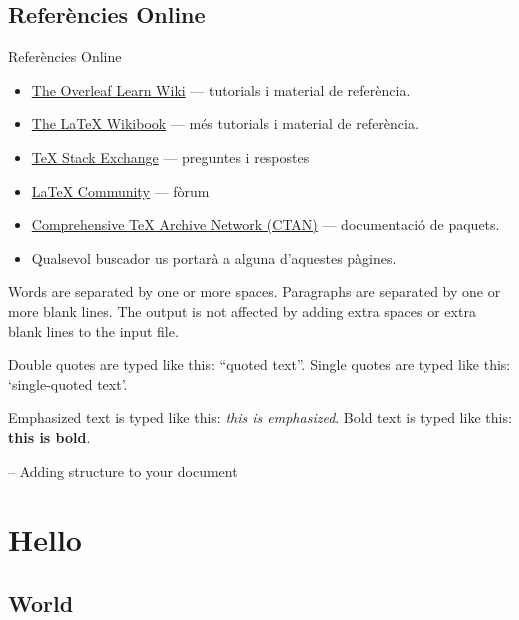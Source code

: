\subsection{Referències Online}
\begin{frame}{Referències Online}
\begin{itemize}
\item \href{https://www.overleaf.com/learn}{The Overleaf Learn Wiki} --- tutorials i material de referència.
\item \href{http://en.wikibooks.org/wiki/LaTeX}{The \LaTeX{} Wikibook} --- més tutorials i material de referència.
\item \href{http://tex.stackexchange.com/}{\TeX{} Stack Exchange} --- preguntes i respostes 
\item \href{http://www.latex-community.org/}{\LaTeX{} Community} --- fòrum 
\item \href{http://ctan.org/}{Comprehensive \TeX{} Archive Network (CTAN)} --- documentació de paquets.
\item Qualsevol buscador us portarà a alguna d'aquestes pàgines.
\end{itemize}
\end{frame}





Words are separated by one or more spaces.  Paragraphs are separated by
one or more blank lines.  The output is not affected by adding extra
spaces or extra blank lines to the input file.

Double quotes are typed like this: ``quoted text''.
Single quotes are typed like this: `single-quoted text'.

Emphasized text is typed like this: \emph{this is emphasized}.
Bold       text is typed like this: \textbf{this is bold}.

-- Adding structure to your document

\section{Hello}

\subsection{World}

